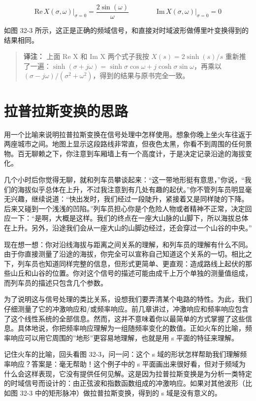 \[\mathrm{Re}\,X(\sigma, \omega)\Big|_{\sigma=0} = \frac{2\sin(\omega)}{\omega} \qquad\qquad \mathrm{Im}\,X(\sigma, \omega)\Big|_{\sigma=0} = 0\]

如图 32-3
所示，这正是正确的频域信号，和直接对时域波形做傅里叶变换得到的结果相同。

\begin{quote}
\textbf{译注：} 上面 Re X 和 Im X 两个式子我按 \(X(s) = 2\sinh(s)/s\)
重新推了一遍：\(\sinh(\sigma + j\omega) = \sinh\sigma\cos\omega + j\cosh\sigma\sin\omega\)，再乘以
\((\sigma - j\omega)/(\sigma^2 + \omega^2)\)，得到的结果与原书完全一致。
\end{quote}

\section{拉普拉斯变换的思路}

用一个比喻来说明拉普拉斯变换在信号处理中怎样使用。想象你晚上坐火车往返于两座城市之间。地图上显示这段路线非常直，但夜色太黑，你看不到周围的任何景物。百无聊赖之下，你注意到车厢墙上有一个高度计，于是决定记录沿途的海拔变化。

几个小时后你觉得无聊，就和列车员攀谈起来：``这一带地形挺有意思，''你说，``我们的海拔似乎总体在上升，不过我注意到有几处有趣的起伏。''你不管列车员明显毫无兴趣，继续说道：``快出发时，我们经过一段陡升，紧接着又是同样陡的下降。后来又碰到一个浅浅的凹陷。''列车员担心你是个危险人物或者精神不正常，决定回应一下：``是啊，大概是这样。我们的终点在一座大山脉的山脚下，所以海拔总体在上升。另外，沿途我们会从一座大山的山脚边经过，还会穿过一个山谷的中央。''

现在想一想：你对沿线海拔与距离之间关系的理解，和列车员的理解有什么不同。由于你直接测量了沿途的海拔，你完全可以宣称自己知道这个关系的一切。相比之下，列车员也知道同样完整的信息，但形式更简单、更直观：造成路线上起伏的那些山丘和山谷的位置。你对这个信号的描述可能由成千上万个单独的测量值组成，而列车员的描述只包含几个参数。

为了说明这与信号处理的类比关系，设想我们要弄清某个电路的特性。为此，我们仔细测量了它的冲激响应和/或频率响应。前几章讲过，冲激响应和频率响应包含了这个线性系统的全部信息。然而，这并不意味着你以最简单的方式掌握了这些信息。具体地说，你把频率响应理解为一组随频率变化的数值。正如火车的比喻，频率响应可以用它周围的''地形''更容易地理解，也就是用
s 平面的特征来理解。

记住火车的比喻，回头看图 32-3，问一问：这个 s
域的形状怎样帮助我们理解频率响应？答案是：毫无帮助！这个例子中的 s
平面画出来很好看，但对于频域为什么会这样表现，它没有提供任何见解。这是因为拉普拉斯变换是为分析一类特定的时域信号而设计的：由正弦波和指数函数组成的冲激响应。如果对其他波形（比如图
32-3 中的矩形脉冲）做拉普拉斯变换，得到的 s 域是没有意义的。

